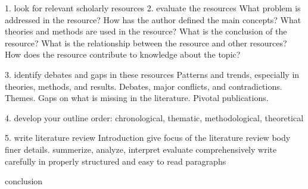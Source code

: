 1. look for relevant scholarly resources
2. evaluate the resources 
    What problem is addressed in the resource?
    How has the author defined the main concepts?
    What theories and methods are used in the resource?
    What is the conclusion of the resource?
    What is the relationship between the resource and other resources?
    How does the resource contribute to knowledge about the topic?

3. identify debates and gaps in these resources
    Patterns and trends, especially in theories, methods, and results.
    Debates, major conflicts, and contradictions.
    Themes.
    Gaps on what is missing in the literature.
    Pivotal publications.


4. develop your outline
order: chronological, thematic, methodological, theoretical
    

5. write literature review
    Introduction
        give focus of the literature review
    body
        finer details.
        summerize, analyze, interpret
        evaluate comprehensively
        write carefully in properly structured and easy to read paragraphs
        
    conclusion









